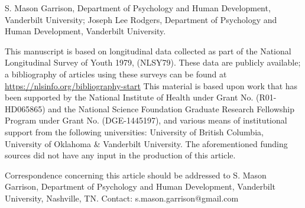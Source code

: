 {\small S. Mason Garrison, Department of Psychology and Human Development, Vanderbilt University; Joseph Lee Rodgers, Department of Psychology and Human Development, Vanderbilt University.

This manuscript is based on longitudinal data collected as part of the National Longitudinal Survey of Youth 1979, (NLSY79). These data are publicly available; a bibliography of articles using these surveys can be found at \url{https://nlsinfo.org/bibliography-start} This material is based upon work that has been supported by the National Institute of Health under Grant No. (R01-HD065865) and the National Science Foundation Graduate Research Fellowship Program under Grant No. (DGE-1445197), and various means of institutional support from the following universities: University of British Columbia, University of Oklahoma \& Vanderbilt University. The aforementioned funding sources did not have any input in the production of this article.

Correspondence concerning this article should be addressed to S. Mason Garrison, Department of Psychology and Human Development, Vanderbilt University, Nashville, TN. Contact: s.mason.garrison@gmail.com}
